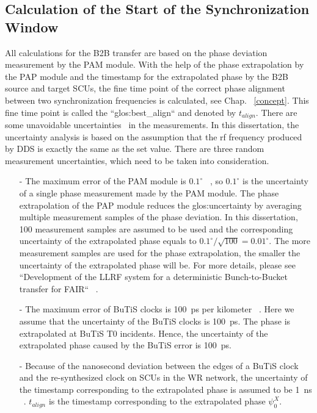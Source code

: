 \subsection{Calculation of the Start of the Synchronization Window}
All calculations for the B2B transfer are based on the phase deviation measurement by the PAM module. With the help of the phase extrapolation by the PAP module and the timestamp for the extrapolated phase by the B2B source and target SCUs, the fine time point of the correct phase alignment between two synchronization frequencies is calculated, see Chap. ~\ref{concept}. This fine time point is called the ``\gls{glos:best_align}`` and denoted by $t_\mathit{align}$. There are some unavoidable uncertainties~\cite{taylor_introduction_1982} in the measurements. In this dissertation, the uncertainty analysis is based on the assumption that the rf frequency produced by DDS is exactly the same as the set value. There are three random measurement uncertainties, which need to be taken into consideration.  
\begin{itemize}
\item[-]The maximum error of the PAM module is $0.1^\circ$ ~\cite{klingbeil_detailed_2013}, so $0.1^\circ$ is the uncertainty of a single phase measurement made by the PAM module. The phase extrapolation of the PAP module reduces the \gls{glos:uncertainty} by averaging multiple measurement samples of the phase deviation. In this dissertation, 100 measurement samples are assumed to be used and the corresponding uncertainty of the extrapolated phase equals to $0.1^\circ/\sqrt{100} =0.01^\circ$. The more measurement samples are used for the phase extrapolation, the smaller the uncertainty of the extrapolated phase will be. For more details, please see ``Development of the LLRF system for a deterministic Bunch-to-Bucket transfer for FAIR`` ~\cite{ferrand_development_nodate}.
\item[-]The maximum error of BuTiS clocks is \SI{100}{\ps} per kilometer ~\cite{moritz_common_2012}. Here we assume that the uncertainty of the BuTiS clocks is \SI{100}{\ps}. The phase is extrapolated at BuTiS T0 incidents. Hence, the uncertainty of the extrapolated phase caused by the BuTiS error is \SI{100}{\ps}. 
\item[-]Because of the nanosecond deviation between the edges of a BuTiS clock and the re-synthesized clock on SCUs in the WR network, the uncertainty of the timestamp corresponding to the extrapolated phase is assumed to be \SI{1}{ns} ~\cite{kreider_receiver_2014}. $t_\mathit{align}$ is the timestamp corresponding to the extrapolated phase $\psi^\mathit{X}_0$.
\end{itemize}
 
